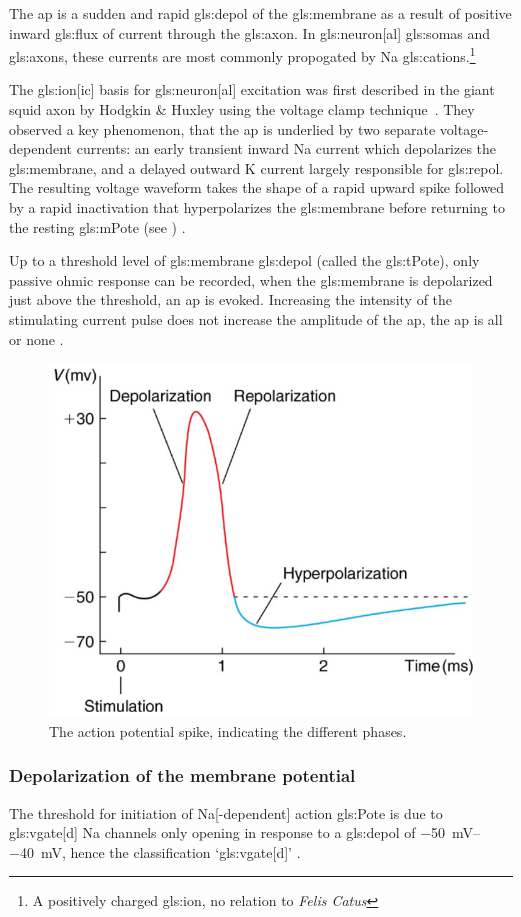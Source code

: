 \documentclass[class={myRUCProject}, crop=false]{standalone}
\begin{document}
The \gls{ap} is a sudden and rapid \gls{gls:depol} of the \gls{gls:membrane} as a result of positive inward \gls{gls:flux} of current through the \gls{gls:axon}. In \gls{gls:neuron}[al] \glspl{gls:soma} and \glspl{gls:axon}, these currents are most commonly propogated by \gls{Na} \glspl{gls:cation}.{}\footnote{A positively charged \gls{gls:ion}, no relation to \textit{Felis Catus}}

The \gls{gls:ion}[ic] basis for \gls{gls:neuron}[al] excitation was first described in the giant squid axon by Hodgkin \& Huxley  using the voltage clamp technique~\cite{HodHux1952}. They observed a key phenomenon, that the \gls{ap} is underlied by two separate voltage-dependent currents: an early transient inward \gls{Na} current which depolarizes the \gls{gls:membrane}, and a delayed outward \gls{K} current largely responsible for \gls{gls:repol}. 
The resulting voltage waveform takes the shape of a rapid upward spike followed by a rapid inactivation that hyperpolarizes the \gls{gls:membrane} before returning to the resting \gls{gls:mPote} (see ) \cite{}.

Up to a threshold level of \gls{gls:membrane} \gls{gls:depol} (called the \gls{gls:tPote}), only passive ohmic response can be recorded, when the \gls{gls:membrane} is depolarized just above the threshold, an \gls{ap} is evoked. 
Increasing the intensity of the stimulating current pulse does not increase the amplitude of the \gls{ap}, the \gls{ap} is all or none \cite{}. 
\begin{figure}[H]
  \centering
  \includegraphics[width=0.5\linewidth]{Pictures//Anakin/AP.png}
  \caption{The action potential spike, indicating the different phases.}\label{fig:AP}
\end{figure}


\subsubsection{Depolarization of the membrane potential}\label{sec:depol}
The threshold for initiation of \gls{Na}[-dependent] action \gls{gls:Pote} is due to \gls{gls:vgate}[d] \gls{Na} channels only opening in response to a \gls{gls:depol} of \qtyrange{-50}{-40}{\mV}, hence the classification `\gls{gls:vgate}[d]' \cite{}. 
\end{document}

